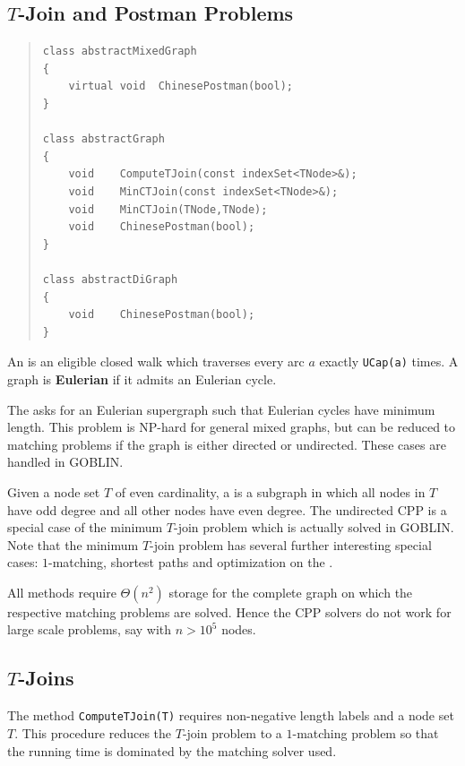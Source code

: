 \documentclass[a4paper,11pt,twoside]{book}
\begin{document}
\begin{multicols}{2}
\section{$T$-Join and Postman Problems}
\label{slb_solve_t_join}
\methods
\begin{quote}
\begin{verbatim}
class abstractMixedGraph
{
    virtual void  ChinesePostman(bool);
}

class abstractGraph
{
    void    ComputeTJoin(const indexSet<TNode>&);
    void    MinCTJoin(const indexSet<TNode>&);
    void    MinCTJoin(TNode,TNode);
    void    ChinesePostman(bool);
}

class abstractDiGraph
{
    void    ChinesePostman(bool);
}
\end{verbatim}
\end{quote}
An  is an eligible closed walk which traverses every arc $a$
exactly \verb/UCap(a)/ times. A graph is {\bf Eulerian} 
if it admits an Eulerian cycle.

The  asks for an Eulerian supergraph such
that Eulerian cycles have minimum length. This problem is NP-hard for
general mixed graphs, but can be reduced to matching problems if the graph
is either directed or undirected. These cases are handled in GOBLIN.

Given a node set $T$ of even cardinality, a  is a subgraph in which
all nodes in $T$ have odd degree and all other nodes have even degree.
The undirected CPP is a special case of the minimum $T$-join problem which is
actually solved in GOBLIN. Note that the minimum $T$-join problem has several
further interesting special cases: $1$-matching, shortest paths and
optimization on the .

All methods require $\Theta(n^2)$ storage for the complete graph on which the
respective matching problems are solved. Hence the CPP solvers do not work for
large scale problems, say with $n>10^5$ nodes.


\subsection{$T$-Joins}
The method \verb/ComputeTJoin(T)/ requires non-negative length labels and
a node set $T$. This procedure reduces the $T$-join problem to a $1$-matching
problem so that the running time is dominated by the matching solver used.


\end{multicols}
\end{document}
